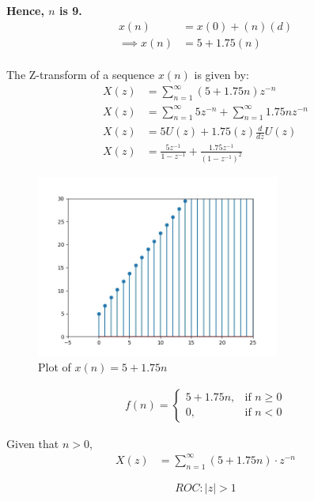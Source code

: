 \documentclass[journal,12pt,twocolumn]{IEEEtran}
\theoremstyle{remark}
\begin{document}
\begin{center}
\textbf{Hence, $n$ is 9.}
\vspace{1mm}
\begin{align}
x(n) &= x(0) + (n)(d)
\\ \implies x(n) &= 5 + 1.75(n)
\end{align}
\\The Z-transform of a sequence $x(n)$ is given by:
\begin{align}
  X(z) &= \sum_{n=1}^{\infty} (5 + 1.75n)z^{-n}  
  \\ X(z) &= \sum_{n=1}^{\infty} 5z^{-n} + \sum_{n=1}^{\infty} 1.75nz^{-n}
  \\ X(z) &= 5U(z) + 1.75(z)\frac{d}{dz} U(z)
  \\ X(z) &= \frac{5z^{-1}}{1-z^{-1}}+\frac{1.75z^{-1}}{(1-z^{-1})^{2}}
\end{align}
\begin{figure}
    \centering
    \includegraphics[width = 8cm]{figs/fig1.jpg}
    \caption{Plot of $x(n) = 5 + 1.75n$}
    \label{fig:enter-label}
\end{figure}

 \begin{align}
        f(n) = 
        \begin{cases}
            5 + 1.75n, & \text{if } n \geq 0 \\
            0, & \text{if } n < 0
        \end{cases}
    \end{align}

\vspace{4mm}
Given that \( n > 0 \),
    \begin{align}
    X(z) &= \sum_{n=1}^{\infty} (5 + 1.75n) \cdot z^{-n}
    \end{align}

\[ROC : |z| > 1\]

\end{center}
\end{document}
